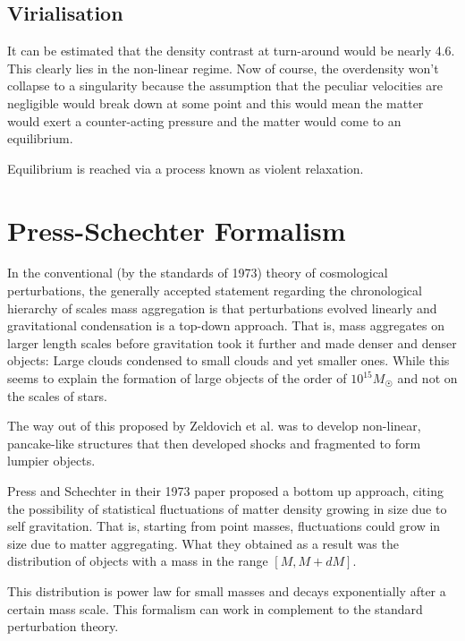 \documentclass[12pt,a4paper,twoside]{book}
\begin{document}
		\subsection{Virialisation}
			It can be estimated that the density contrast at turn-around would be nearly 4.6. This clearly lies in the non-linear regime. Now of course, the overdensity won't collapse to a singularity because the assumption that the peculiar velocities are negligible would break down at some point and this would mean the matter would exert a counter-acting pressure and the matter would come to an equilibrium.
			
			Equilibrium is reached via a process known as violent relaxation.
	\section{Press-Schechter Formalism}
		In the conventional (by the standards of 1973) theory of cosmological perturbations,	the generally accepted statement regarding the chronological hierarchy of scales mass aggregation is that perturbations evolved linearly and gravitational condensation is a top-down approach. That is, mass aggregates on larger length scales before gravitation took it further and made denser and denser objects: Large clouds condensed to small clouds and yet smaller ones. While this seems to explain the formation of large objects of the order of $10^{15}M_\Sun$ and not on the scales of stars.
		
		The way out of this proposed by Zeldovich et al. was to develop non-linear, pancake-like structures that then developed shocks and fragmented to form lumpier objects.
		
		Press and Schechter in their 1973 paper proposed a bottom up approach, citing the possibility of statistical fluctuations of matter density growing in size due to self gravitation. That is, starting from point masses, fluctuations could grow in size due to matter aggregating. What they obtained as a result was the distribution of objects with a mass in the range $[M, M+dM]$. 
		
		This distribution is power law for small masses and decays exponentially after a certain mass scale. This formalism can work in complement to the standard perturbation theory.
\end{document}

